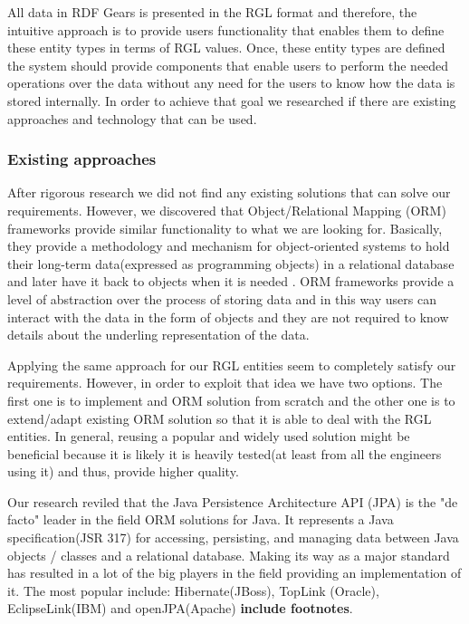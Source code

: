 All data in RDF Gears is presented in the RGL format and therefore, the intuitive approach is to provide users functionality that enables them to define these entity types in terms of RGL values. Once, these entity types are defined the system should provide components that enable users to perform the needed operations over the data without any need for the users to know how the data is stored internally. In order to achieve that goal we researched if there are existing approaches and technology that can be used.

\subsubsection{Existing approaches}

After rigorous research we did not find any existing solutions that can solve our requirements. However, we discovered that Object/Relational Mapping (ORM) frameworks provide similar functionality to what we are looking for. Basically, they provide a methodology and mechanism for object-oriented systems to hold their long-term data(expressed as programming objects) in a relational database and later have it back to objects when it is needed \cite{Neil}. ORM frameworks provide a level of abstraction over the process of storing data and in this way users can interact with the data in the form of objects and they are not required to know details about the underling representation of the data. 

Applying the same approach for our RGL entities seem to completely satisfy our requirements. However, in order to exploit that idea we have two options. The first one is to implement and ORM solution from scratch and the other one is to extend/adapt existing ORM solution so that it is able to deal with the RGL entities. In general, reusing a popular and widely used solution might be beneficial because it is likely it is heavily tested(at least from all the engineers using it) and thus, provide higher quality. 

Our research reviled that the Java Persistence Architecture API (JPA) is the "de facto" leader in the field ORM solutions for Java. It represents a Java specification(JSR 317) for accessing, persisting, and managing data between Java objects / classes and a relational database. Making its way as a major standard has resulted in a lot of the big players in the field providing an implementation of it. The most popular include: Hibernate(JBoss), TopLink (Oracle), EclipseLink(IBM) and openJPA(Apache) \textbf{include footnotes}. 

